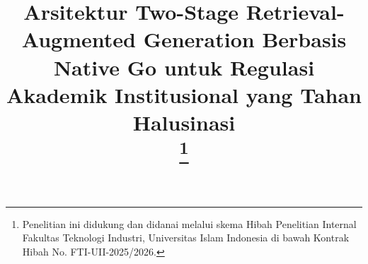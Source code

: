 \documentclass[conference]{IEEEtran}
\begin{document}
\title{Arsitektur Two-Stage Retrieval-Augmented Generation Berbasis Native Go untuk Regulasi Akademik Institusional yang Tahan Halusinasi\\
\thanks{Penelitian ini didukung dan didanai melalui skema Hibah Penelitian Internal Fakultas Teknologi Industri, Universitas Islam Indonesia di bawah Kontrak Hibah No. FTI-UII-2025/2026.}
}

\author{
\and
{}
}

\maketitle
\end{document}
